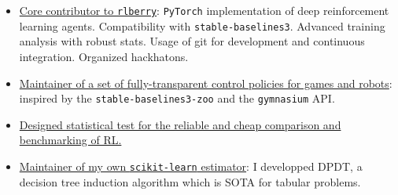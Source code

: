 \begin{itemize}
    \item[] \href{https://rlberry-py.github.io/rlberry/about.html#contributors}{Core contributor to \texttt{rlberry}}: \texttt{PyTorch} implementation of deep reinforcement learning agents. Compatibility with \texttt{stable-baselines3}. Advanced training analysis with robust stats. Usage of git for development and continuous integration. Organized hackhatons.
    \item[] \href{https://github.com/KohlerHECTOR/interpretable-rl-zoo}{Maintainer of a set of fully-transparent control policies for games and robots}: inspired by the \texttt{stable-baselines3-zoo} and the \texttt{gymnasium} API.
    \item[] \href{https://github.com/TimotheeMathieu/adastop}{Designed statistical test for the reliable and cheap comparison and benchmarking of RL.}
    \item[] \href{https://github.com/KohlerHECTOR/DPDTreeEstimator}{Maintainer of my own \texttt{scikit-learn} estimator}: I developped DPDT, a decision tree induction algorithm which is SOTA for tabular problems. 
\end{itemize}

